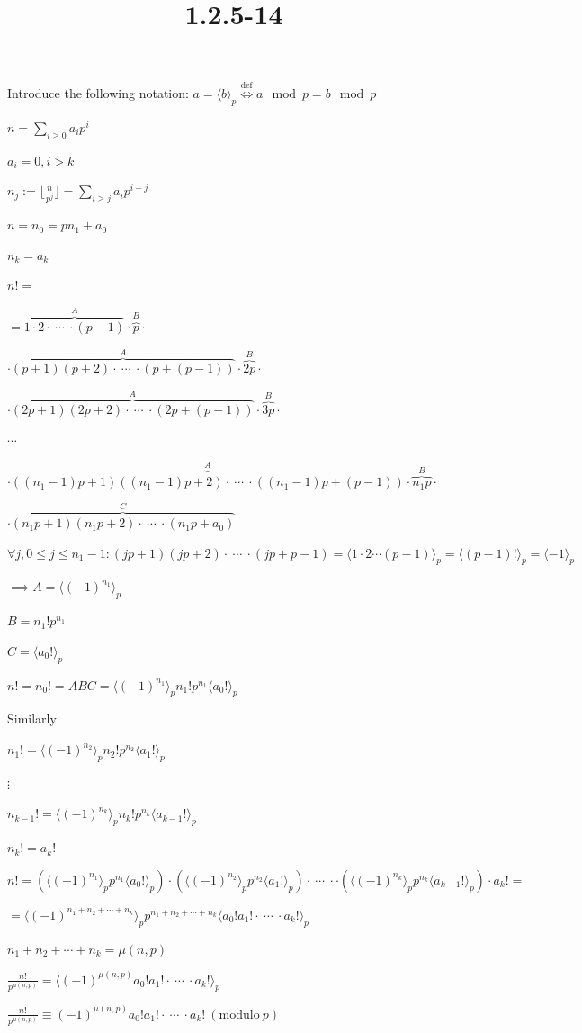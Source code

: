 \documentclass{article}
\title{1.2.5-14}
\begin{document}
\maketitle

Introduce the following notation: \( a = \langle{b} \rangle_p \overset{\mathrm{def}}{\iff} a \mod p = b \mod p \)

\( n = \sum_{i \geq 0}{a_i p^i} \)

\( a_i = 0, i > k \)

\( n_j := \lfloor{\frac{n}{p^j}}\rfloor = \sum_{i \geq j}{a_i p^{i-j}} \)

\( n = n_0 = pn_1 + a_0 \)

\( n_k = a_k \)

\( n! = \)

\( = \overbrace{1 \cdot 2  \cdot\ \cdots\ \cdot (p - 1)}^A \cdot \overbrace{p}^B \cdot \)

\( \cdot \overbrace{(p+1)(p+2) \cdot\ \cdots\ \cdot (p+(p-1))}^A \cdot \overbrace{2p}^B \cdot \)

\( \cdot \overbrace{(2p+1)(2p+2) \cdot\ \cdots\ \cdot (2p+(p-1))}^A \cdot \overbrace{3p}^B \cdot \)

\( \cdots \)

\( \cdot \overbrace{((n_1-1)p+1)((n_1-1)p+2) \cdot\ \cdots\ \cdot ((n_1-1)p+(p-1))}^A \cdot \overbrace{n_1p}^B \cdot \)

\( \cdot \overbrace{(n_1p+1)(n_1p+2) \cdot\ \cdots\ \cdot (n_1p+a_0)}^C \)

\( \forall j, 0 \leq j \leq n_1 - 1: (jp+1)(jp+2) \cdot\ \cdots\ \cdot (jp+p-1) = \langle{1 \cdot 2 \cdots (p-1)}\rangle_p = \langle{(p-1)!}\rangle_p = \langle{-1}\rangle_p \)

\( \implies A = \langle(-1)^{n_1}\rangle_p \)

\( B = n_1!p^{n_1} \)

\( C = \langle{a_0!}\rangle_p \)

\( n! = n_0! = ABC = \langle{(-1)^{n_1}}\rangle_p n_1!p^{n_1}\langle{a_0!}\rangle_p \)

Similarly

\( n_1! = \langle{(-1)^{n_2}}\rangle_p n_2!p^{n_2}\langle{a_1!}\rangle_p \)

\( \vdots \)

\( n_{k-1}! = \langle{(-1)^{n_k}}\rangle_p n_k!p^{n_k}\langle{a_{k-1}!}\rangle_p \)

\( n_k! = a_k! \)

\( n! = (\langle{(-1)^{n_1}}\rangle_p p^{n_1}\langle{a_0!}\rangle_p) \cdot (\langle{(-1)^{n_2}}\rangle_p p^{n_2}\langle{a_1!}\rangle_p) \cdot\ \cdots\ \cdot \cdot (\langle{(-1)^{n_k}}\rangle_p p^{n_k}\langle{a_{k-1}!}\rangle_p) \cdot a_k! = \)

\( = \langle{(-1)^{n_1+n_2+ \cdots + n_k}}\rangle_p p^{n_1+n_2+\cdots +n_k}\langle{a_0!a_1! \cdot\ \cdots\ \cdot a_k!}\rangle_p \)

\( n_1+n_2+\cdots+n_k = \mu(n,p) \)

\( \frac{n!}{p^{\mu(n,p)}} = \langle{(-1)^{\mu(n,p)}a_0!a_1! \cdot\ \cdots\ \cdot a_k!}\rangle_p \)

\( \frac{n!}{p^{\mu(n,p)}} \equiv (-1)^{\mu(n,p)}a_0!a_1! \cdot\ \cdots\ \cdot a_k! \ (\mathrm{modulo}\ p) \)
\end{document}

